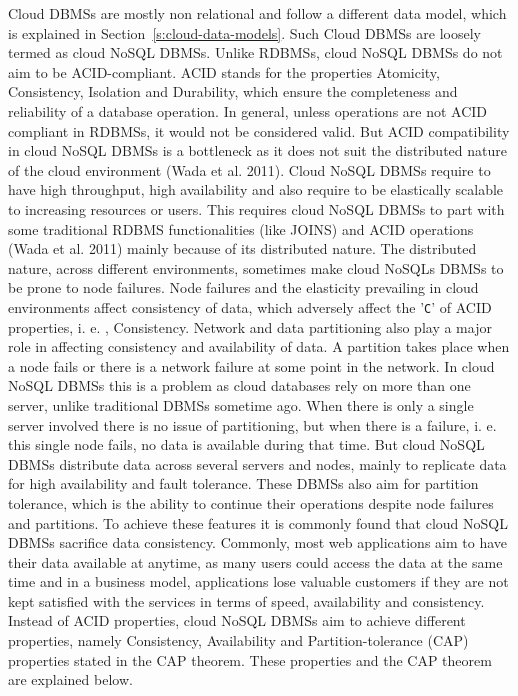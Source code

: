 Cloud \acp{DBMS} are mostly non relational and follow a different data model,  
which is explained in Section~\ref{s:cloud-data-models}.  Such Cloud \acp{DBMS}
are loosely termed as cloud \ac{NoSQL} \acp{DBMS}.  Unlike \acp{RDBMS},   cloud
\ac{NoSQL} \acp{DBMS} do not aim to be ACID-compliant. 
ACID stands for the properties Atomicity,   Consistency,   Isolation and Durability,  
which ensure the completeness and reliability of a database operation.  In
general,   unless operations are not ACID compliant in \acp{RDBMS},   it would not
be considered valid. 
But ACID compatibility in cloud \ac{NoSQL} \acp{DBMS} is a bottleneck as it does
not suit the distributed nature of the cloud environment (Wada et al.  2011). 
Cloud \ac{NoSQL} \acp{DBMS} require to have high throughput,   high availability
and also require to be elastically scalable to increasing resources or users. 
This requires cloud \ac{NoSQL} \acp{DBMS} to part with some traditional
\ac{RDBMS} functionalities (like JOINS) and ACID operations (Wada et al.  2011)
mainly because of its distributed nature.  The distributed nature,   across
different environments,   sometimes make cloud \acp{NoSQL} \acp{DBMS} to be prone
to node failures.  Node failures and the elasticity prevailing in cloud
environments affect consistency of data,   which adversely affect the '\texttt{C}'
of ACID properties,   i. e. ,   Consistency.  Network and data partitioning also play a
major role in affecting consistency and availability of data.   A partition takes
place when a node fails or there is a network failure at some point in the
network.  In cloud \ac{NoSQL} \acp{DBMS} this is a problem as cloud databases
rely on more than one server,   unlike traditional \acp{DBMS} sometime ago.  When
there is only a single server involved there is no issue of partitioning,   but
when there is a failure,   i. e.  this single node fails,   no data is available
during that time.  But cloud \ac{NoSQL} \acp{DBMS} distribute data across several
servers and nodes,   mainly to replicate data for high availability and fault
tolerance. 
These \acp{DBMS} also aim for partition tolerance,   which is the ability to
continue their operations despite node failures and partitions.  To achieve these
features it is commonly found that cloud \ac{NoSQL} \acp{DBMS} sacrifice data
consistency.  Commonly,   most web applications aim to have their data available at
anytime,   as many users could access the data at the same time and in a business
model,   applications lose valuable customers if they are not kept satisfied with
the services in terms of speed,   availability and consistency.  Instead of ACID
properties,   cloud \ac{NoSQL} \acp{DBMS} aim to achieve different
properties,   namely Consistency,   Availability and Partition-tolerance (CAP)
properties stated in the CAP theorem. 
These properties and the CAP theorem are explained below. 

